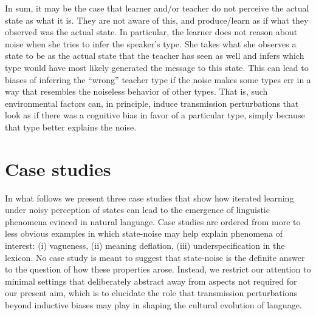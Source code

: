 \documentclass[10pt,a4paper]{article}
\newcommand{\citeposs}[2][]{\citeauthor{#2}'s (\citeyear[#1]{#2})}
\begin{document}
In sum, it may be the case that learner and/or teacher do not perceive the actual state as what
it is. They are not aware of this, and produce/learn as if what they observed was the actual
state. In particular, the learner does not reason about noise when she tries to infer the
speaker's type. She takes what she observes a state to be as the actual state that the teacher
has seen as well and infers which type would have most likely generated the message to this
state. This can lead to biases of inferring the ``wrong'' teacher type if the noise makes some
types err in a way that resembles the noiseless behavior of other types. That is, such
environmental factors can, in principle, induce transmission perturbations that look as if there was a
cognitive bias in favor of a particular type, simply because that type better explains the
noise.


\section{Case studies}

In what follows we present three case studies that show how iterated learning under noisy
perception of states can lead to the emergence of linguistic phenomena evinced in natural
language. Case studies are ordered from more to less obvious examples in which state-noise may
help explain phenomena of interest: (i) vagueness, (ii) meaning deflation, (iii)
underspecification in the lexicon.
No case study is meant to suggest that state-noise is the definite answer to the question of
how these properties arose. Instead, we restrict our attention to minimal settings that
deliberately abstract away from aspects not required for our present aim, which is to elucidate
the role that transmission perturbations beyond inductive biases may play in shaping the
cultural evolution of language.
\end{document}
